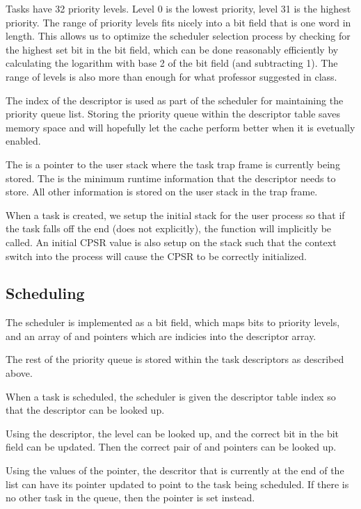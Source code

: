 \documentclass[pdftex,10pt,a4paper]{article}
\begin{document}
Tasks have 32 priority levels. Level 0 is the lowest priority, level
31 is the highest priority. The range of priority levels fits nicely
into a bit field that is one word in length. This allows us to
optimize the scheduler selection process by checking for the highest
set bit in the bit field, which can be done reasonably efficiently by
calculating the logarithm with base 2 of the bit field (and
subtracting 1). The range of levels is also more than enough for what
professor suggested in class.

The  index of the descriptor is used as part of the
scheduler for maintaining the priority queue list. Storing the
priority queue within the descriptor table saves memory space
and will hopefully let the cache perform better when it is evetually
enabled.

The  is a pointer to the user stack where the task trap frame
is currently being stored. The  is the minimum runtime
information that the descriptor needs to store. All other information
is stored on the user stack in the trap frame.

When a task is created, we setup the initial stack for the user
process so that if the task falls off the end (does not 
explicitly), the  function will implicitly be called. An
initial CPSR value is also setup on the stack such that the context
switch into the process will cause the CPSR to be correctly
initialized.

\subsection*{Scheduling}

The scheduler is implemented as a bit field, which maps bits to
priority levels, and an array of  and  pointers
which are indicies into the descriptor array.

The rest of the priority queue is stored within the task descriptors
as described above.

When a task is scheduled, the scheduler is given the descriptor table
index so that the descriptor can be looked up.

Using the descriptor, the  level can be looked up, and
the correct bit in the bit field can be updated. Then the correct pair
of  and  pointers can be looked up.

Using the values of the  pointer, the descritor that is
currently at the end of the list can have its  pointer
updated to point to the task being scheduled. If there is no other
task in the queue, then the  pointer is set instead.
\end{document}
